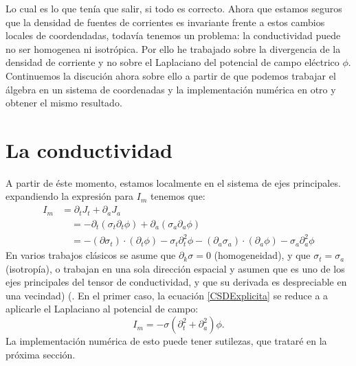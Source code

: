 \documentclass{article}
\begin{document}
Lo cual es lo que tenía que salir, si todo es correcto.
Ahora que estamos seguros que la densidad de fuentes de corrientes
es invariante frente a estos cambios locales de coordendadas, 
todavía tenemos un problema: la conductividad puede no ser homogenea
ni isotrópica. Por ello he trabajado sobre la divergencia
de la densidad de corriente y no sobre el Laplaciano del potencial
de campo eléctrico $\phi$. Continuemos la discución ahora sobre ello
a partir de que podemos trabajar el álgebra en un sistema de coordenadas
y la implementación numérica en otro y obtener el mismo resultado. 

\section{La conductividad}

A partir de éste momento, estamos localmente en el sistema 
de ejes principales. expandiendo la expresión para $I_m$ tenemos que:
\begin{equation} \label{CSDExplicita}
\begin{split}
I_m & =\partial_t J_t+ \partial_a J_a \\
& \quad = -\partial_t (\sigma_t \partial_t \phi)  + 
\partial_a (\sigma_a \partial_a \phi)  \\
& \quad = - (\partial \sigma_t) \cdot ( \partial_t \phi) - \sigma_t \partial_t^2 \phi 
- (\partial_a \sigma_a) \cdot ( \partial_a \phi) - \sigma_a \partial_a^2 \phi 
\end{split}
\end{equation} 
En varios trabajos clásicos se  asume que $\partial_k \sigma=0$ (homogeneidad), y que 
$\sigma_t=\sigma_a$ (isotropía), o trabajan en una sola dirección
espacial y asumen que es uno de los ejes principales del tensor de conductividad,
y que su derivada es despreciable en una vecindad)
(\cite{Holsheimer87, Leski11, Mitzdorf85, Pettersen2006, Vaknin88}.  
En el primer caso, la ecuación \ref{CSDExplicita} se reduce a 
a aplicarle el Laplaciano al potencial de campo:
\begin{equation}
I_m=-\sigma(\partial_t^2 + \partial_a^2) \phi.
\end{equation}
La implementación numérica de esto puede tener sutilezas, que trataré en la 
próxima sección. 



 



\end{document}
